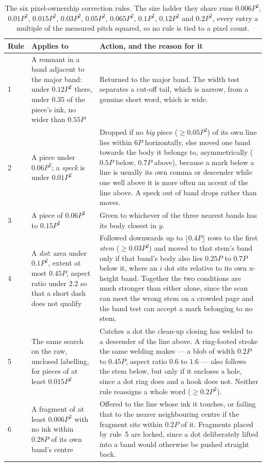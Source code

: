 \begin{table}[h]
\centering
\fontsize{8.5}{10.2}\selectfont
\setlength{\tabcolsep}{4pt}
\begin{tabularx}{\linewidth}{|p{0.7cm}|p{3.6cm}|X|}
\hline
\textbf{Rule} & \textbf{Applies to} & \textbf{Action, and the reason for it} \\
\hline
1 & A remnant in a band adjacent to the major band: under $0.12P^2$ there, under $0.35$ of the piece's ink, no wider than $0.55P$ & Returned to the major band. The width test separates a cut-off tail, which is narrow, from a genuine short word, which is wide. \\
\hline
2 & A piece under $0.06P^2$; a \emph{speck} is under $0.01P^2$ & Dropped if no \emph{big} piece ($\ge0.05P^2$) of its own line lies within $6P$ horizontally, else moved one band towards the body it belongs to, asymmetrically ($0.5P$ below, $0.7P$ above), because a mark below a line is usually its own comma or descender while one well above it is more often an accent of the line above. A speck out of band drops rather than moves. \\
\hline
3 & A piece of $0.06P^2$ to $0.15P^2$ & Given to whichever of the three nearest bands has its body closest in $y$. \\
\hline
4 & A \emph{dot}: area under $0.1P^2$, extent at most $0.45P$, aspect ratio under 2.2 so that a short dash does not qualify & Followed downwards up to $\lfloor0.4P\rfloor$ rows to the first \emph{stem} ($\ge0.03P^2$) and moved to that stem's band only if that band's body also lies $0.25P$ to $0.7P$ below it, where an $i$ dot sits relative to its own x-height band. Together the two conditions are much stronger than either alone, since the scan can meet the wrong stem on a crowded page and the band test can accept a mark belonging to no stem. \\
\hline
5 & The same search on the raw, unclosed labelling, for pieces of at least $0.015P^2$ & Catches a dot the clean-up closing has welded to a descender of the line above. A ring-footed stroke the same welding makes --- a blob of width $0.2P$ to $0.45P$, aspect ratio $0.6$ to $1.6$ --- also follows the stem below, but only if it encloses a hole, since a dot ring does and a hook does not. Neither rule reassigns a whole word ($\ge0.2P^2$). \\
\hline
6 & A fragment of at least $0.006P^2$ with no ink within $0.28P$ of its own band's centre & Offered to the line whose ink it touches, or failing that to the nearer neighbouring centre if the fragment sits within $0.2P$ of it. Fragments placed by rule~5 are locked, since a dot deliberately lifted into a band would otherwise be pushed straight back. \\
\hline
\end{tabularx}
\caption{The six pixel-ownership correction rules. The size ladder they share runs $0.006P^2$, $0.01P^2$, $0.015P^2$, $0.03P^2$, $0.05P^2$, $0.065P^2$, $0.1P^2$, $0.12P^2$ and $0.2P^2$, every entry a multiple of the measured pitch squared, so no rule is tied to a pixel count.}
\label{tab:seg-own}
\end{table}


